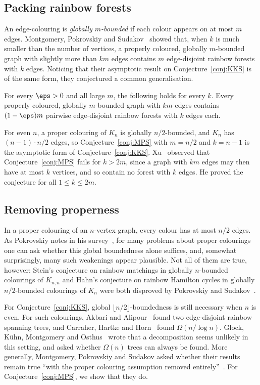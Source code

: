 \subsection{Packing rainbow forests}\label{sec:mps}
An edge-colouring is \emph{globally $m$-bounded} if each colour appears on at most $m$ edges.
Montgomery, Pokrovskiy and Sudakov~\cite{MPS} showed that, when $k$ is much smaller than the number of vertices, a properly coloured, globally $m$-bounded graph with slightly more than $km$ edges contains $m$ edge-disjoint rainbow forests with $k$ edges.
Noticing that their asymptotic result on Conjecture~\ref{conj:KKS} is of the same form, they conjectured a common generalisation.

\begin{conjecture}\label{conj:MPS}
For every $\eps>0$ and all large $m$, the following holds for every $k$.
Every properly coloured, globally $m$-bounded graph with $km$ edges contains $(1-\eps)m$ pairwise edge-disjoint rainbow forests with $k$ edges each.
\end{conjecture}

For even $n$, a proper colouring of $K_n$ is globally $n/2$-bounded, and $K_n$ has $(n-1)\cdot n/2$ edges, so Conjecture~\ref{conj:MPS} with $m=n/2$ and $k=n-1$ is the asymptotic form of Conjecture~\ref{conj:KKS}.
Xu~\cite{Xu} observed that Conjecture~\ref{conj:MPS} fails for $k>2m$, since a graph with $km$ edges may then have at most $k$ vertices, and so contain no forest with $k$ edges.
He proved the conjecture for all $1\le k\le 2m$.

\subsection{Removing properness}\label{sec:bounded}
In a proper colouring of an $n$-vertex graph, every colour has at most $n/2$ edges.
As Pokrovskiy notes in his survey~\cite{Pok}, for many problems about proper colourings one can ask whether this global boundedness alone suffices, and, somewhat surprisingly, many such weakenings appear plausible.
Not all of them are true, however: Stein's conjecture on rainbow matchings in globally $n$-bounded colourings of $K_{n,n}$ and Hahn's conjecture on rainbow Hamilton cycles in globally $n/2$-bounded colourings of $K_n$ were both disproved by Pokrovskiy and Sudakov~\cite{PSHahn}.

For Conjecture~\ref{conj:KKS}, global $\lfloor n/2\rfloor$-boundedness is still necessary when $n$ is even.
For such colourings, Akbari and Alipour~\cite{AA} found two edge-disjoint rainbow spanning trees, and Carraher, Hartke and Horn~\cite{CHH} found $\Omega(n/\log n)$.
Glock, K\"uhn, Montgomery and Osthus~\cite{GKMO} wrote that a decomposition seems unlikely in this setting, and asked whether $\Omega(n)$ trees can always be found.
More generally, Montgomery, Pokrovskiy and Sudakov asked whether their results remain true ``with the proper colouring assumption removed entirely''~\cite[Section~10]{MPS}.
For Conjecture~\ref{conj:MPS}, we show that they do.


